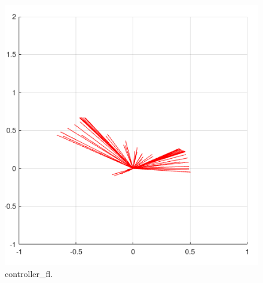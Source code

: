 \documentclass{article}
\begin{document}
\begin{itemize}
\begin{figure}[H]	
\centerline{\includegraphics[width=0.75\columnwidth]{figures/controller_fl}}
\caption{controller\_fl.}
\label{fig:figure_4}
\end{figure}


\end{itemize}
\end{document}
